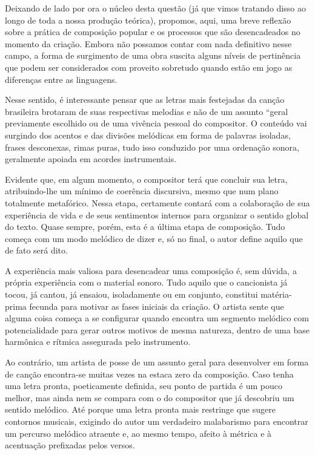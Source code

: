 Deixando de lado por ora o núcleo desta questão (já que vimos tratando
disso ao longo de toda a nossa produção teórica), propomos, aqui, uma
breve reflexão sobre a prática de composição popular e os processos que
são desencadeados no momento da criação. Embora não possamos contar com
nada definitivo nesse campo, a forma de surgimento de uma obra suscita
alguns níveis de pertinência que podem ser considerados com proveito
sobretudo quando estão em jogo as diferenças entre as linguagens.

Nesse sentido, é interessante pensar que as letras mais festejadas da
canção brasileira brotaram de suas respectivas melodias e não de um
assunto ``geral previamente escolhido ou de uma vivência pessoal do
compositor. O conteúdo vai surgindo dos acentos e das divisões melódicas
em forma de palavras isoladas, frases desconexas, rimas puras, tudo isso
conduzido por uma ordenação sonora, geralmente apoiada em acordes
instrumentais.

Evidente que, em algum momento, o compositor terá que concluir sua
letra, atribuindo-lhe um mínimo de coerência discursiva, mesmo que num
plano totalmente metafórico. Nessa etapa, certamente contará com a
colaboração de sua experiência de vida e de seus sentimentos internos
para organizar o sentido global do texto. Quase sempre, porém, esta é a
última etapa de composição. Tudo começa com um modo melódico de dizer e,
só no final, o autor define aquilo que de fato será dito.

A experiência mais valiosa para desencadear uma composição é, sem
dúvida, a própria experiência com o material sonoro. Tudo aquilo que o
cancionista já tocou, já cantou, já ensaiou, isoladamente ou em
conjunto, constitui matéria-prima fecunda para motivar as fases iniciais
da criação. O artista sente que alguma coisa começa a se configurar
quando encontra um segmento melódico com potencialidade para gerar
outros motivos de mesma natureza, dentro de uma base harmônica e rítmica
assegurada pelo instrumento.

Ao contrário, um artista de posse de um assunto geral para desenvolver
em forma de canção encontra-se muitas vezes na estaca zero da
composição. Caso tenha uma letra pronta, poeticamente definida, seu
ponto de partida é um pouco melhor, mas ainda nem se compara com o do
compositor que já descobriu um sentido melódico. Até porque uma letra
pronta mais restringe que sugere contornos musicais, exigindo do autor
um verdadeiro malabarismo para encontrar um percurso melódico atraente
e, ao mesmo tempo, afeito à métrica e à acentuação prefixadas pelos
versos.

